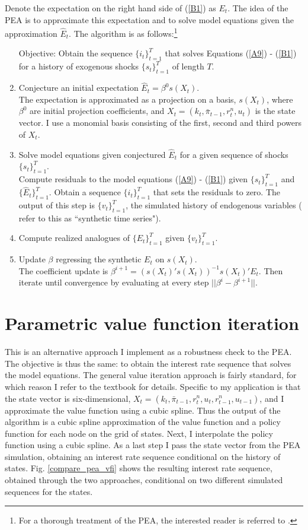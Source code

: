 \documentclass[11pt]{article}
\renewcommand{\[}{\begin{equation}}
\renewcommand{\]}{\end{equation}}
\begin{document}
Denote the expectation on the right hand side of (\ref{B1}) as $E_t$. The idea of the PEA is to approximate this expectation and to solve model equations given the approximation $\hat{E}_t$. The algorithm is as follows:\footnote{For a thorough treatment of the PEA, the interested reader is referred to \cite{christiano2000occasionally}.}
\begin{enumerate}
\item[Objective:] Obtain the sequence $\{i_t\}_{t=1}^T$ that solves Equations (\ref{A9}) - (\ref{B1}) for a history of exogenous shocks $\{s_t\}_{t=1}^T$ of length $T$. 
\item Conjecture an initial expectation $\hat{E}_t=\beta^0 s(X_t)$. \\
The expectation is approximated as a projection on a basis, $s(X_t)$, where $\beta^0$ are initial projection coefficients, and $X_t = (k_t,\bar{\pi}_{t-1}, r^n_t, u_t)$ is the state vector. I use a monomial basis consisting of the first, second and third powers of $X_t$.
\item Solve model equations given conjectured $\hat{E}_t$ for a given sequence of shocks $\{s_t\}_{t=1}^T$.\\
Compute residuals to the model equations (\ref{A9}) - (\ref{B1}) given $\{s_t\}_{t=1}^T$ and $\{\hat{E}_t\}_{t=1}^T$. Obtain a sequence $\{i_t\}_{t=1}^T$ that sets the residuals to zero. The output of this step is $\{v_t\}_{t=1}^T$, the simulated history of endogenous variables (\cite{christiano2000occasionally} refer to this as ``synthetic time series"). 
\item Compute realized analogues of $\{E_t\}_{t=1}^T$ given $\{v_t\}_{t=1}^T$.
\item Update $\beta$ regressing the synthetic $E_t$ on $s(X_t)$.\\
The coefficient update is $\beta^{i+1} = (s(X_t)'s(X_t))^{-1}s(X_t)'E_t$. Then iterate until convergence by evaluating at every step $||\beta^i-\beta^{i+1}||$.
\end{enumerate}

\section{Parametric value function iteration} \label{vfi}
This is an alternative approach I implement as a robustness check to the PEA. The objective is thus the same: to obtain the interest rate sequence that solves the model equations. The general value iteration approach is fairly standard, for which reason I refer to the \cite{judd1998numerical} textbook for details. Specific to my application is that the state vector is six-dimensional, $X_t = (k_t,\bar{\pi}_{t-1}, r^n_t, u_t, r^n_{t-1}, u_{t-1})$, and I approximate the value function using a cubic spline. Thus the output of the algorithm is a cubic spline approximation of the value function and a policy function for each node on the grid of states. Next, I interpolate the policy function using a cubic spline. As a last step I pass the state vector from the PEA simulation, obtaining an interest rate sequence conditional on the history of states. Fig. \ref{compare_pea_vfi} shows the resulting interest rate sequence, obtained through the two approaches, conditional on two different simulated sequences for the states.
\end{document}
